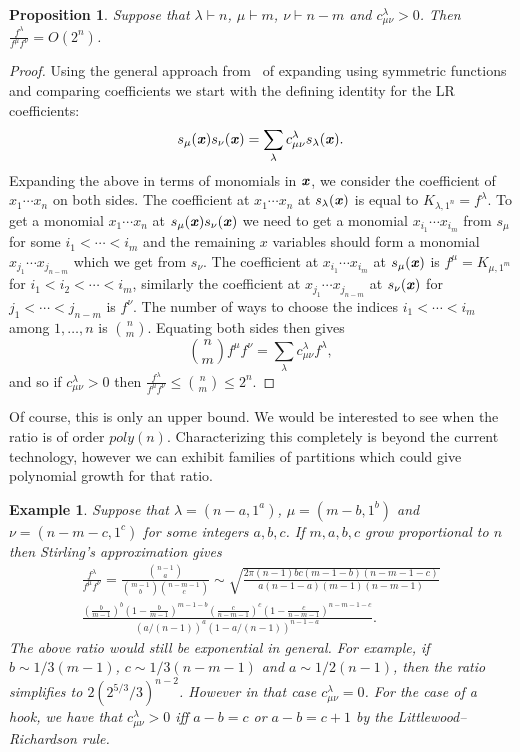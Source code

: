 \documentclass[11pt]{amsart}
\newtheorem{prop}[thm]{Proposition}
\newtheorem{ex}[thm]{Example}
\theoremstyle{plain}
\theoremstyle{definition}
\numberwithin{equation}{section}
\def\bx{{\textbf{\textit{x}}}}
\newcommand{\la}{\lambda}
\def\la{\lambda}
\begin{document}
\begin{prop}
Suppose that $\la \vdash n$, $\mu \vdash m$, $\nu\vdash n-m$ and $c^{\la}_{\mu\nu}>0$. Then $\frac{f^\la}{f^\mu f^\nu}  = O(2^n)$. 
\end{prop}
\begin{proof}
Using the general approach from~\cite{PPY} of expanding using symmetric functions and comparing coefficients we start with the defining identity for the LR coefficients:
$$s_\mu(\bx) s_\nu(\bx) = \sum_\la c^\la_{\mu\nu} s_\la(\bx).$$
Expanding the above in terms of monomials in $\bx$, we consider the coefficient of $x_1\cdots x_n$ on both sides. The coefficient at $x_1\cdots x_n$ at $s_\la(\bx)$ is equal to $K_{\la,1^n}=f^\la$. To get a monomial $x_1\cdots x_n$ at $s_\mu(\bx) s_\nu(\bx)$ we need to get a monomial $x_{i_1}\cdots x_{i_m}$ from $s_\mu$ for some $i_1<\cdots <i_m$ and the remaining $x$ variables should form a monomial $x_{j_1}\cdots x_{j_{n-m}}$ which we get from $s_\nu$. The coefficient at $x_{i_1}\cdots x_{i_m}$ at $s_\mu(\bx)$ is $f^\mu=K_{\mu,1^m}$ for $i_1<i_2<\cdots <i_m$, similarly the coefficient at $x_{j_1}\cdots x_{j_{n-m}} $ at $s_{\nu}(\bx)$ for $j_1<\cdots <j_{n-m}$ is $f^\nu$. The number of ways to choose the indices $i_1<\cdots <i_m$ among  $1,\ldots,n$ is $\binom{n}{m}$. Equating both sides then gives 
$$\binom{n}{m} f^\mu f^\nu = \sum_\la c^\la_{\mu\nu} f^\la,$$
and so if $c^\la_{\mu\nu}>0$ then $\frac{f^\la}{f^\mu f^\nu} \leq \binom{n}{m} \leq 2^n$. 
\end{proof}
Of course, this is only an upper bound. We would be interested to see when the ratio is of order $poly(n)$. Characterizing this completely is beyond the current technology, however we can exhibit families of partitions which could give polynomial growth for that ratio.

\begin{ex}
Suppose that $\la = (n-a,1^a)$, $\mu =(m-b, 1^b)$ and $\nu = (n-m-c,1^c)$ for some integers $a,b,c$. If $m,a,b,c$ grow proportional to $n$ then Stirling's approximation gives 
\begin{align*}
\frac{f^\la}{f^\mu f^\nu} = \frac{ \binom{n-1}{a} }{\binom{m-1}{b} \binom{n-m-1}{c}} \sim \sqrt{  \frac{ 2\pi (n-1) bc(m-1-b)(n-m-1-c)}{a(n-1-a) (m-1)(n-m-1)} } \\ \frac{ \left(\frac{b}{m-1}\right)^b \left( 1-\frac{b}{m-1} \right)^{m-1-b} \left( \frac{c}{n-m-1}\right)^c \left(1-\frac{c}{n-m-1}\right)^{n-m-1-c} }{ (a/(n-1))^a (1-a/(n-1))^{n-1-a} }.
\end{align*}
The above ratio would still be exponential in general. For example, if  $b\sim 1/3 (m-1)$, $c \sim 1/3(n-m-1)$ and $a \sim 1/2 (n-1)$, then the ratio simplifies to  
$ 2 (2^{5/3} /3 )^{n-2}$. However in that case $c^\la_{\mu\nu}=0$. 
For the case of a hook, we have that $c^\la_{\mu\nu}>0$ iff $a-b=c$ or $a-b=c+1$ by the Littlewood--Richardson rule.  
\end{ex} 
\end{document}

